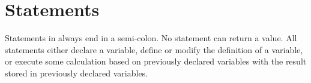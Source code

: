 \section{Statements}
\label{sec:statements}

Statements in \sys{} always end in a semi-colon. No statement
can return a value. All statements either declare a variable,
define or modify the definition of a variable, or execute
some calculation based on previously declared variables with
the result stored in previously declared variables.

